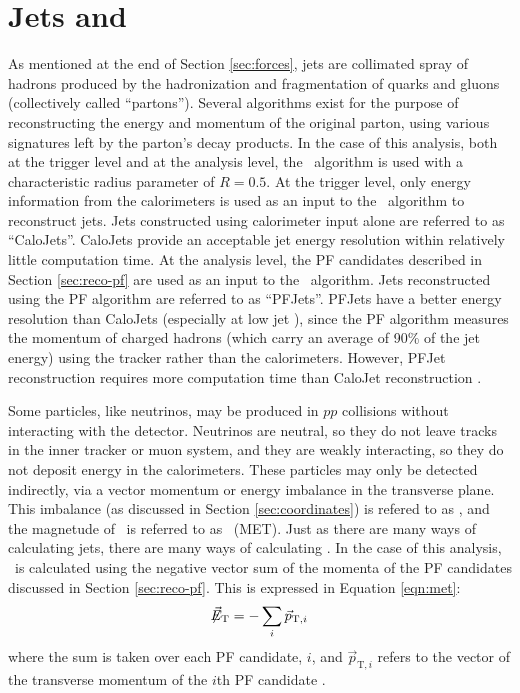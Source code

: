\section{Jets and \met}
\label{sec:jetmet}

As mentioned at the end of Section \ref{sec:forces}, jets are collimated spray of hadrons produced
by the hadronization and fragmentation of quarks and gluons (collectively called ``partons'').
Several algorithms exist \cite{jetography} for the purpose of reconstructing the energy and momentum
of the original parton, using various signatures left by the parton's decay products.
In the case of this analysis, both at the trigger level and at the analysis level, the \akt~algorithm 
\cite{anti-kt} is used with a characteristic radius parameter of $R=0.5$.
At the trigger level, only energy information from the calorimeters is used as an input to the
\akt~algorithm to reconstruct jets.  Jets constructed using calorimeter input alone
are referred to as ``CaloJets''.  CaloJets provide an acceptable jet energy resolution
within relatively little computation time.
At the analysis level, the PF candidates described in Section \ref{sec:reco-pf} are used
as an input to the \akt~algorithm.  Jets reconstructed using the PF algorithm are referred to as ``PFJets''.
PFJets have a better energy resolution than CaloJets \cite{pf-1} (especially at low jet \pt), 
since the PF algorithm measures the momentum of charged hadrons (which carry an average of 90\% of the jet energy)
using the tracker rather than the calorimeters.  However, PFJet reconstruction requires more computation time
than CaloJet reconstruction \cite{cms-jets}.

Some particles, like neutrinos, may be produced in $pp$ collisions without interacting
with the detector.  Neutrinos are neutral, so they do not leave tracks in the inner tracker or muon system,
and they are weakly interacting, so they do not deposit energy in the calorimeters.
These particles may only be detected indirectly, via a vector momentum or energy imbalance
in the transverse plane.  This imbalance (as discussed in Section \ref{sec:coordinates}) is refered to 
as \metvec, and the magnetude of \metvec~is referred to as \met~(MET).
Just as there are many ways of calculating jets, there are many ways of calculating \met.
In the case of this analysis, \met~is calculated using the negative vector sum of the momenta of the 
PF candidates discussed in Section \ref{sec:reco-pf}.  This is expressed in Equation \ref{eqn:met}:
\begin{equation}
  \not\!\!{\vec{E}_{\text{T}}} = - \sum_{i} \vec{p}_{\text{T},i}
  \label{eqn:met}
\end{equation}
where the sum is taken over each PF candidate, $i$, and $\vec{p}_{\text{T},i}$ refers to the 
vector of the transverse momentum of the $i$th PF candidate \cite{cms-met}.

